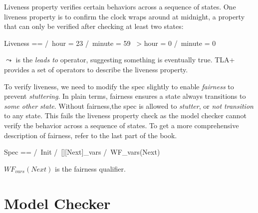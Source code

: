 Liveness property verifies certain behaviors across a sequence of states. One
liveness property is to confirm the clock wraps around at midnight, a property
that can only be verified after checking at least two states: \newline

\begin{tla}
    Liveness ==
        /\ hour = 23 /\ minute = 59 ~> hour = 0 /\ minute = 0
\end{tla}
\begin{tlatex}
%
\end{tlatex}
\newline

$\leadsto$ is the \textit{leads to} operator, suggesting something is eventually
true. TLA+ provides a set of operators to describe the liveness property.\newline 

To verify liveness, we need to modify the spec slightly to enable
\textit{fairness} to prevent \textit{stuttering}. In plain terms, fairness
ensures a state always transitions to \textit{some other state}. Without fairness,the spec is allowed to \textit{stutter}, or \textit{not transition} to any state. This fails the liveness property check as the model checker cannot verify the behavior across a sequence of states. To get a more 
comprehensive description of fairness, refer to the last part of the
book.\newline

\begin{tla}
    Spec ==
        /\ Init
        /\ [][Next]_vars
        /\ WF_vars(Next)
\end{tla}
\begin{tlatex}
%
%
%
%
\end{tlatex}
\newline

$WF_{vars}(Next)$ is the fairness qualifier.


\section{Model Checker}


